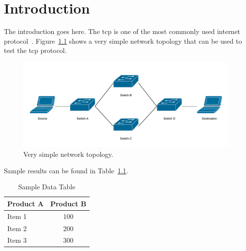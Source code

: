\graphicspath{{Chapters/Introduction/Figures/}}

\chapter{Introduction}%
\label{chap:introduction}

The introduction goes here.
The \gls{tcp} is one of the most commonly used internet
protocol~\cite{networksBook}.
Figure~\ref{fig:diamondNetwork} shows a very simple network topology that can be
used to test the \gls{tcp} protocol.
%
\begin{figure}
  \centering
  \includegraphics[width=\textwidth,keepaspectratio]{diamondNetwork}
  \caption{Very simple network topology.}%
  \label{fig:diamondNetwork}
\end{figure}
%
Sample results can be found in Table~\ref{tab:sampleTable}.
%
\begin{table}
  \centering
  \caption{Sample Data Table}%
  \label{tab:sampleTable}
  \begin{tabular}{lc}
      \toprule
      Product A & Product B \\
      \midrule
      Item 1    & 100 \\
      Item 2    & 200 \\
      Item 3    & 300 \\
      \bottomrule
  \end{tabular}
\end{table}
